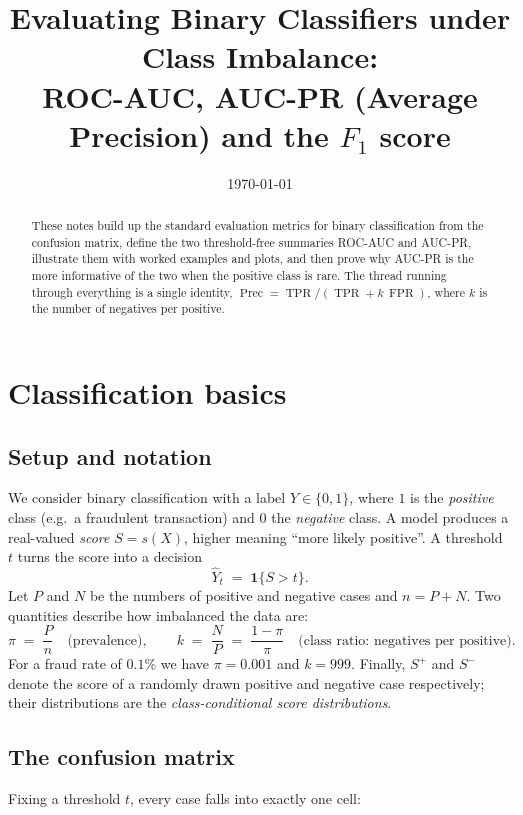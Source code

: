 \documentclass[11pt,a4paper]{article}
\title{Evaluating Binary Classifiers under Class Imbalance:\\
ROC-AUC, AUC-PR (Average Precision) and the $F_1$ score}
\author{}
\date{\today}
\DeclareMathOperator{\TPR}{TPR}
\DeclareMathOperator{\FPR}{FPR}
\DeclareMathOperator{\Prec}{Prec}
\theoremstyle{plain}
\theoremstyle{definition}
\theoremstyle{remark}
\begin{document}
\maketitle

\begin{abstract}
\noindent
These notes build up the standard evaluation metrics for binary classification from the confusion
matrix, define the two threshold-free summaries ROC-AUC and AUC-PR, illustrate them with worked
examples and plots, and then prove why AUC-PR is the more informative of the two when the positive
class is rare. The thread running through everything is a single identity,
$\Prec = \TPR/(\TPR + k\,\FPR)$, where $k$ is the number of negatives per positive.
\end{abstract}

\tableofcontents

\section{Classification basics}

\subsection{Setup and notation}
We consider binary classification with a label $Y\in\{0,1\}$, where $1$ is the \emph{positive} class
(e.g.\ a fraudulent transaction) and $0$ the \emph{negative} class. A model produces a real-valued
\emph{score} $S=s(X)$, higher meaning ``more likely positive''. A threshold $t$ turns the score into a
decision
\[
  \hat Y_t \;=\; \mathbf 1\{S>t\}.
\]
Let $P$ and $N$ be the numbers of positive and negative cases and $n=P+N$. Two quantities describe
how imbalanced the data are:
\[
  \pi \;=\; \frac{P}{n}\quad\text{(prevalence)},
  \qquad
  k \;=\; \frac{N}{P} \;=\; \frac{1-\pi}{\pi}\quad\text{(class ratio: negatives per positive)}.
\]
For a fraud rate of $0.1\%$ we have $\pi=0.001$ and $k=999$. Finally, $S^{+}$ and $S^{-}$ denote the score
of a randomly drawn positive and negative case respectively; their distributions are the
\emph{class-conditional score distributions}.

\subsection{The confusion matrix}
Fixing a threshold $t$, every case falls into exactly one cell:
\end{document}
